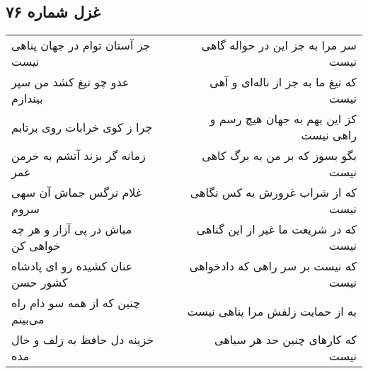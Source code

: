 \begin{center}
\section*{غزل شماره ۷۶}
\label{sec:sh076}
\begin{longtable}{l p{0.5cm} r}
جز آستان توام در جهان پناهی نیست
&&
سر مرا به جز این در حواله گاهی نیست
\\
عدو چو تیغ کشد من سپر بیندازم
&&
که تیغ ما به جز از ناله‌ای و آهی نیست
\\
چرا ز کوی خرابات روی برتابم
&&
کز این بهم به جهان هیچ رسم و راهی نیست
\\
زمانه گر بزند آتشم به خرمن عمر
&&
بگو بسوز که بر من به برگ کاهی نیست
\\
غلام نرگس جماش آن سهی سروم
&&
که از شراب غرورش به کس نگاهی نیست
\\
مباش در پی آزار و هر چه خواهی کن
&&
که در شریعت ما غیر از این گناهی نیست
\\
عنان کشیده رو ای پادشاه کشور حسن
&&
که نیست بر سر راهی که دادخواهی نیست
\\
چنین که از همه سو دام راه می‌بینم
&&
به از حمایت زلفش مرا پناهی نیست
\\
خزینه دل حافظ به زلف و خال مده
&&
که کارهای چنین حد هر سیاهی نیست
\\
\end{longtable}
\end{center}
